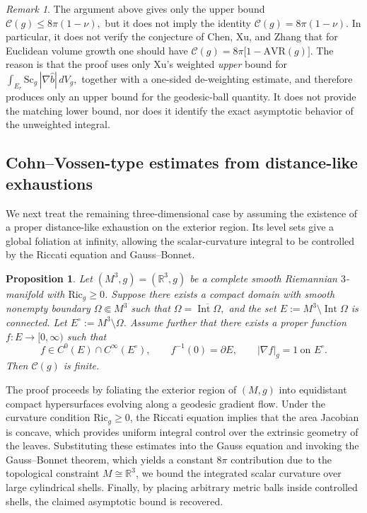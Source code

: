 \documentclass[12pt,oneside,a4paper]{article}
\newtheorem{proposition}[definition]{Proposition}
\theoremstyle{mytheorem}
\theoremstyle{remark}
\newtheorem{remark}[definition]{Remark}
\begin{document}
\begin{remark}
The argument above gives only the upper bound
$\mathcal C(g)\le 8\pi(1-\nu),$ but it does not imply the identity
$\mathcal C(g)= 8\pi(1-\nu).$
In particular, it does not verify the conjecture of Chen, Xu, and Zhang
\cite[Conjecture~1.7]{2026arXiv260210393C} that for Euclidean volume growth one should have $\mathcal C(g)=8\pi\bigl[1-\mathrm{AVR}(g)\bigr].$
The reason is that the proof  uses only Xu's weighted \textit{upper} bound for
$\int_{E_r}\mathrm{Sc}_g\,|\nabla \widehat b|\,dV_g,$
together with a one-sided de-weighting estimate, and therefore produces only an
upper bound for the geodesic-ball quantity. It does not provide the matching
lower bound, nor does it identify the exact asymptotic behavior of the
unweighted integral.
\end{remark}


\subsection{Cohn--Vossen-type estimates from distance-like exhaustions}

We next treat the remaining three-dimensional case by assuming the existence
of a proper distance-like exhaustion on the exterior region. Its level sets
give a global foliation at infinity, allowing the scalar-curvature integral to
be controlled by the Riccati equation and Gauss--Bonnet.


\begin{proposition}\label{level set}
Let $(M^3,g)=(\mathbb{R}^3,g)$ be a complete smooth Riemannian $3$-manifold with $\mathrm{Ric}_g \ge 0$. Suppose there exists a compact domain with smooth nonempty boundary $\Omega\Subset M^3$ such that $\Omega=\overline{\operatorname{Int}\Omega},$
and the set $E:=M^3\setminus \operatorname{Int}\Omega$
is connected. Let $E^\circ:=M^3\setminus \Omega$. Assume further that there exists a proper function $f:E\to[0,\infty)$
such that
\[
f\in C^0(E)\cap C^\infty(E^\circ), \qquad f^{-1}(0)=\partial E, \qquad |\nabla f|_g=1 \ \text{on } E^\circ .
\]
Then $\mathcal{C}(g)$ is finite.
\end{proposition}

  The proof proceeds by foliating the exterior region of $(M,g)$ into equidistant compact hypersurfaces evolving along a geodesic gradient flow. Under the curvature condition $\mathrm{Ric}_g \ge 0$, the Riccati equation implies that the area Jacobian is  concave, which provides uniform integral control over the extrinsic geometry of the leaves. Substituting these estimates into the Gauss equation and invoking the Gauss–Bonnet theorem, which yields a constant $8\pi$ contribution due to the topological constraint $M \cong \mathbb{R}^3$, we bound the integrated scalar curvature over large cylindrical shells. Finally, by placing arbitrary metric balls inside controlled shells, the claimed asymptotic bound is recovered.
\end{document}
